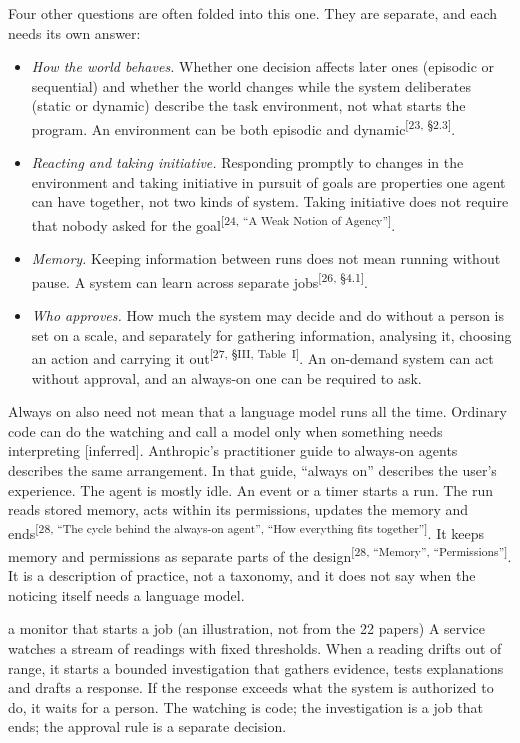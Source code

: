 \documentclass[10pt]{article}
\newcommand{\inferred}{\textsf{\small[inferred]}}
\newcommand{\p}[1]{\textsuperscript{[#1]}}
\begin{document}
Four other questions are often folded into this one. They are separate, and each needs its own answer:
\begin{itemize}
\item \emph{How the world behaves.} Whether one decision affects later ones (episodic or sequential) and whether the world changes while the system deliberates (static or dynamic) describe the task environment, not what starts the program. An environment can be both episodic and dynamic\p{23, \S2.3}.
\item \emph{Reacting and taking initiative.} Responding promptly to changes in the environment and taking initiative in pursuit of goals are properties one agent can have together, not two kinds of system. Taking initiative does not require that nobody asked for the goal\p{24, ``A Weak Notion of Agency''}.
\item \emph{Memory.} Keeping information between runs does not mean running without pause. A system can learn across separate jobs\p{26, \S4.1}.
\item \emph{Who approves.} How much the system may decide and do without a person is set on a scale, and separately for gathering information, analysing it, choosing an action and carrying it out\p{27, \S III, Table~I}. An on-demand system can act without approval, and an always-on one can be required to ask.
\end{itemize}
Always on also need not mean that a language model runs all the time. Ordinary code can do the watching and call a model only when something needs interpreting \inferred.
Anthropic's practitioner guide to always-on agents describes the same arrangement. In that guide, ``always on'' describes the user's experience. The agent is mostly idle. An event or a timer starts a run. The run reads stored memory, acts within its permissions, updates the memory and ends\p{28, ``The cycle behind the always-on agent'', ``How everything fits together''}. It keeps memory and permissions as separate parts of the design\p{28, ``Memory'', ``Permissions''}. It is a description of practice, not a taxonomy, and it does not say when the noticing itself needs a language model.

\begin{example}{a monitor that starts a job (an illustration, not from the 22 papers)}
A service watches a stream of readings with fixed thresholds. When a reading drifts out of range, it starts a bounded investigation that gathers evidence, tests explanations and drafts a response. If the response exceeds what the system is authorized to do, it waits for a person. The watching is code; the investigation is a job that ends; the approval rule is a separate decision.
\end{example}
\end{document}
